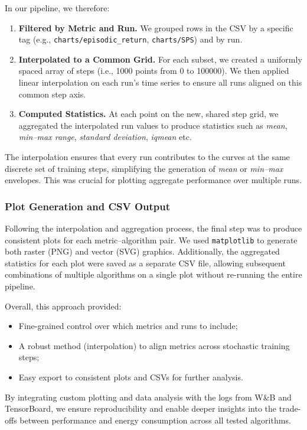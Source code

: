 In our pipeline, we therefore:
\begin{enumerate}
	\item \textbf{Filtered by Metric and Run.} We grouped rows in the CSV by a specific tag (e.g., \texttt{charts/episodic\_return}, \texttt{charts/SPS}) and by run.
	\item \textbf{Interpolated to a Common Grid.} For each subset, we created a uniformly spaced array of steps (i.e., \num{1000} points from \num{0} to \num{100000}). We then applied linear interpolation on each run's time series to ensure all runs aligned on this common step axis.
	\item \textbf{Computed Statistics.} At each point on the new, shared step grid, we aggregated the interpolated run values to produce statistics such as \textit{mean}, \textit{min--max range}, \textit{standard deviation}, \textit{iqmean} etc.
\end{enumerate}
The interpolation ensures that every run contributes to the curves at the same discrete set of training steps, simplifying the generation of \emph{mean} or \emph{min--max} envelopes. This was crucial for plotting aggregate performance over multiple runs.

\subsubsection{Plot Generation and CSV Output}
Following the interpolation and aggregation process, the final step was to produce consistent plots for each metric--algorithm pair. We used \texttt{matplotlib} to generate both raster (PNG) and vector (SVG) graphics. Additionally, the aggregated statistics for each plot were saved as a separate CSV file, allowing subsequent combinations of multiple algorithms on a single plot without re-running the entire pipeline.

Overall, this approach provided:
\begin{itemize}
	\item Fine-grained control over which metrics and runs to include;
	\item A robust method (interpolation) to align metrics across stochastic training steps;
	\item Easy export to consistent plots and CSVs for further analysis.
\end{itemize}
By integrating custom plotting and data analysis with the logs from W\&B and TensorBoard, we ensure reproducibility and enable deeper insights into the trade-offs between performance and energy consumption across all tested algorithms.

